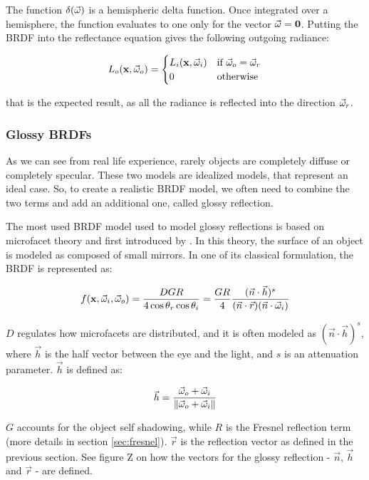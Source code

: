The function $\delta(\vec{\omega})$ is a hemispheric delta function. Once integrated over a hemisphere, the function evaluates to one only for the vector $\vec{\omega} = \mathbf{0}$. Putting the BRDF into the reflectance equation gives the following outgoing radiance:

\begin{equation*}
L_o(\mathbf{x}, \vec{\omega}_o) = \begin{cases}
L_i(\mathbf{x}, \vec{\omega}_i)  &\text{if $\vec{\omega}_o = \vec{\omega}_r$}\\
0 &\text{otherwise}
\end{cases}
\end{equation*}

that is the expected result, as all the radiance is reflected into the direction $\vec{\omega}_r$.

\subsubsection{Glossy BRDFs}

As we can see from real life experience, rarely objects are completely diffuse or completely specular. These two models are idealized models, that represent an ideal case. So, to create a realistic BRDF model, we often need to combine the two terms and add an additional one, called glossy reflection.

The most used BRDF model used to model glossy reflections is based on microfacet theory \citep{Torrance:1992:TOR:136913.136924, Ashikmin:2000:MBG:344779.344814} and first introduced by \citep{Blinn:1977:MLR:965141.563893}. In this theory, the surface of an object is modeled as composed of small mirrors. In one of its classical formulation, the BRDF is represented as:

$$
f(\mathbf{x}, \vec{\omega}_i, \vec{\omega}_o) = \frac{D G R}{4 \cos\theta_r \cos\theta_i} = \frac{G R}{4} \frac{(\vec{n}\cdot\vec{h})^s}{(\vec{n}\cdot\vec{r})(\vec{n}\cdot\vec{\omega}_i)}
$$

$D$ regulates how microfacets are distributed, and it is often modeled as $(\vec{n}\cdot\vec{h})^s$, where $\vec{h}$ is the half vector between the eye and the light, and $s$ is an attenuation parameter. $\vec{h}$ is defined as:

$$
\vec{h} = \frac{\vec{\omega}_o + \vec{\omega}_i}{\left\| \vec{\omega}_o + \vec{\omega}_i \right\|}
$$

$G$ accounts for the object self shadowing, while $R$ is the Fresnel reflection term (more details in section \ref{sec:fresnel}).	$\vec{r}$ is the reflection vector as defined in the previous section. See figure Z on how the vectors for the glossy reflection - $\vec{n}$, $\vec{h}$ and $\vec{r}$ - are defined.

